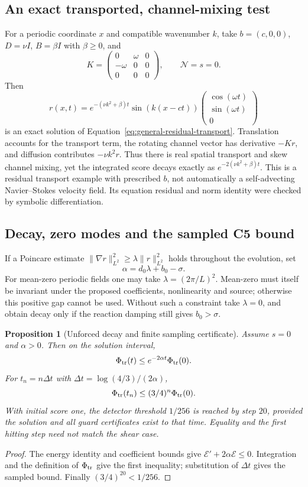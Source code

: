 \documentclass[11pt,a4paper]{article}
\newtheorem{proposition}{Proposition}
\begin{document}
\subsection{An exact transported, channel-mixing test}
For a periodic coordinate $x$ and compatible wavenumber $k$, take
$b=(c,0,0)$, $D=\nu I$, $B=\beta I$ with $\beta\ge0$, and
\[
K=\begin{pmatrix}0&\omega&0\\-\omega&0&0\\0&0&0\end{pmatrix},
\qquad \mathcal N=s=0.
\]
Then
\[
r(x,t)=e^{-(\nu k^2+\beta)t}\sin(k(x-ct))
\begin{pmatrix}\cos(\omega t)\\\sin(\omega t)\\0\end{pmatrix}
\]
is an exact solution of Equation~\eqref{eq:general-residual-transport}.
Translation accounts for the transport term, the rotating channel vector
has derivative $-Kr$, and diffusion contributes $-\nu k^2r$.
Thus there is real spatial transport and skew channel mixing, yet the
integrated score decays exactly as $e^{-2(\nu k^2+\beta)t}$.
This is a residual transport example with prescribed $b$, not automatically
a self-advecting Navier--Stokes velocity field. Its equation residual and
norm identity were checked by symbolic differentiation.

\subsection{Decay, zero modes and the sampled C5 bound}
If a Poincare estimate $\|\nabla r\|_{L^2}^2\ge
\lambda\|r\|_{L^2}^2$ holds throughout the evolution, set
\[
\alpha=d_0\lambda+b_0-\sigma.
\]
For mean-zero periodic fields one may take $\lambda=(2\pi/L)^2$.
Mean-zero must itself be invariant under the proposed coefficients,
nonlinearity and source; otherwise this positive gap cannot be used.
Without such a constraint take $\lambda=0$, and obtain decay only if the
reaction damping still gives $b_0>\sigma$.

\begin{proposition}[Unforced decay and finite sampling certificate]
\label{prop:general-sampled-decay}
Assume $s=0$ and $\alpha>0$. Then on the solution interval,
\[
\Phi_{\rm tr}(t)\le e^{-2\alpha t}\Phi_{\rm tr}(0).
\]
For $t_n=n\Delta t$ with $\Delta t=\log(4/3)/(2\alpha)$,
\[
\Phi_{\rm tr}(t_n)\le(3/4)^n\Phi_{\rm tr}(0).
\]
With initial score one, the detector threshold $1/256$ is reached by step
$20$, provided the solution and all guard certificates exist to that time.
Equality and the first hitting step need not match the shear case.
\end{proposition}
\begin{proof}
The energy identity and coefficient bounds give
$\mathcal E'+2\alpha\mathcal E\le0$. Integration and the definition
of $\Phi_{\rm tr}$ give the first inequality; substitution of $\Delta t$
gives the sampled bound. Finally $(3/4)^{20}<1/256$.
\end{proof}
\end{document}
